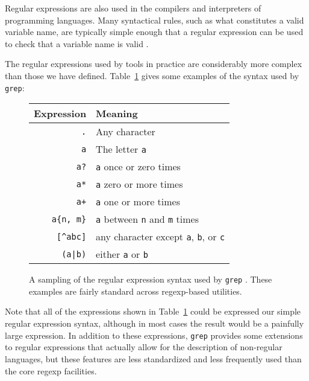 \documentclass{bcthesis}
\newcommand{\footcite}[2]{\xspace\cite[pg.~{#2}]{#1}\xspace}
\begin{document}
		Regular expressions are also used in the compilers and interpreters of programming languages.
		Many syntactical rules, such as what constitutes a valid variable name, are typically simple enough that a regular expression can be used to check that a variable name is valid \footcite{hopcroft}{45 -- 46}.

		The regular expressions used by tools in practice are considerably more complex than those we have defined.
		Table~\ref{tab:grep_regexps} gives some examples of the syntax used by \texttt{grep}:

		\begin{figure}[H]
			\renewcommand{\v}[1]{\verb!{#1}!}
			\centering
			\begin{tabular}{r l}
				\textbf{Expression} 		& \textbf{Meaning} \\
				\hline
				\verb!.! 			& Any character \\
				\verb!a! 			& The letter \verb!a! \\
				\verb!a?! 			& \verb!a! once or zero times \\
				\verb!a*! 			& \verb!a! zero or more times \\
				\verb!a+! 			& \verb!a! one or more times \\
				\verb!a{n, m}! 	& \verb!a! between \verb!n! and \verb!m! times \\
				\verb![^abc]! 		& any character except \verb!a!, \verb!b!, or \verb!c! \\
				\verb!(a|b)! 		& either \verb!a! or \verb!b! \\
				\hline
			\end{tabular}
			\caption{
				A sampling of the regular expression syntax used by \texttt{grep} \cite{man_grep}.
				These examples are fairly standard across regexp-based utilities.
			}
			\label{tab:grep_regexps}
		\end{figure}

		Note that all of the expressions shown in Table~\ref{tab:grep_regexps} could be expressed our simple regular expression syntax, although in most cases the result would be a painfully large expression.
		In addition to these expressions, \texttt{grep} provides some extensions to regular expressions that actually allow for the description of non-regular languages, but these features are less standardized and less frequently used than the core regexp facilities.



\iffalse
{}%
\label{ch:mathematical-notation}
\end{document}
